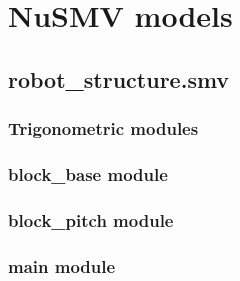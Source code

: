 \section{NuSMV models}
\subsection{robot\_structure.smv}
\subsubsection{Trigonometric modules}
\label{ch:appendixNusmvTrig}


\subsubsection{block\_base module}
\label{ch:appendixNusmvBase}


% 

\subsubsection{block\_pitch module}
\label{ch:appendixNusmvPitch}


\subsubsection{main module}
\label{ch:appendixNusmvMain}


